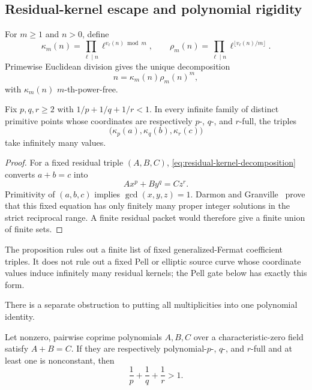 \subsection{Residual-kernel escape and polynomial rigidity}

For $m\geq1$ and $n>0$, define
\[
 \kappa_m(n)=\prod_{\ell\mid n}\ell^{v_\ell(n)\bmod m},
 \qquad
 \rho_m(n)=\prod_{\ell\mid n}
       \ell^{\lfloor v_\ell(n)/m\rfloor}.
\]
Primewise Euclidean division gives the unique decomposition
\begin{equation}\label{eq:residual-kernel-decomposition}
                         n=\kappa_m(n)\rho_m(n)^m,
\end{equation}
with $\kappa_m(n)$ $m$-th-power-free.

\begin{proposition}
\label{prop:kernel-escape}
Fix $p,q,r\geq2$ with $1/p+1/q+1/r<1$.  In every infinite family of
distinct primitive points whose coordinates are respectively
$p$-, $q$-, and $r$-full, the triples
\[
       \bigl(\kappa_p(a),\kappa_q(b),\kappa_r(c)\bigr)
\]
take infinitely many values.
\end{proposition}

\begin{proof}
For a fixed residual triple $(A,B,C)$,
\eqref{eq:residual-kernel-decomposition} converts $a+b=c$ into
\[
                         Ax^p+By^q=Cz^r.
\]
Primitivity of $(a,b,c)$ implies $\gcd(x,y,z)=1$.  Darmon and
Granville~\cite[Theorem~2]{DarmonGranville1995} prove that this fixed
equation has only finitely many proper integer solutions in the strict
reciprocal range.  A finite residual packet would therefore give a finite
union of finite sets.
\end{proof}

The proposition rules out a finite list of fixed generalized-Fermat
coefficient triples.  It does not rule out a fixed Pell or elliptic source
curve whose coordinate values induce infinitely many residual kernels; the
Pell gate below has exactly this form.

There is a separate obstruction to putting all multiplicities into one
polynomial identity.

\begin{proposition}
\label{prop:polynomial-full-obstruction}
Let nonzero, pairwise coprime polynomials $A,B,C$ over a
characteristic-zero field satisfy $A+B=C$.  If they are respectively
polynomial-$p$-, $q$-, and $r$-full and at least one is nonconstant, then
\[
                         \frac1p+\frac1q+\frac1r>1.
\]
\end{proposition}


